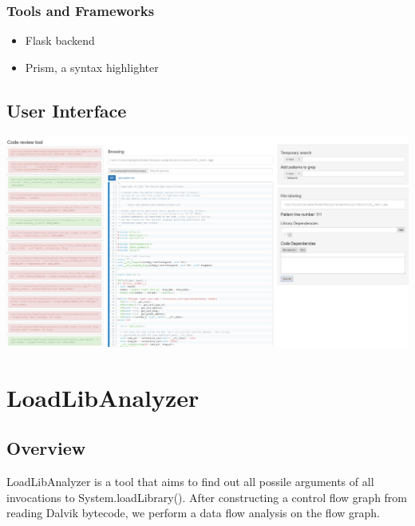 \documentclass[12pt, portrait]{article}
\begin{document}
\begin{multicols}{2}
    \subsubsection*{Tools and Frameworks}
    {\color{secondary}
      \begin{itemize}
      \item Flask backend
      \item Prism, a syntax highlighter
      \end{itemize}
    }
    \subsection*{User Interface}
    \includegraphics[width=\linewidth]{screenshot.png}

\columnbreak
  \section*{LoadLibAnalyzer}
  \subsection*{Overview}
  LoadLibAnalyzer is a tool that aims to find out all possile arguments of all invocations to System.loadLibrary(). After constructing a control flow graph from reading Dalvik bytecode, we perform a data flow analysis on the flow graph.

\end{multicols}
\end{document}
